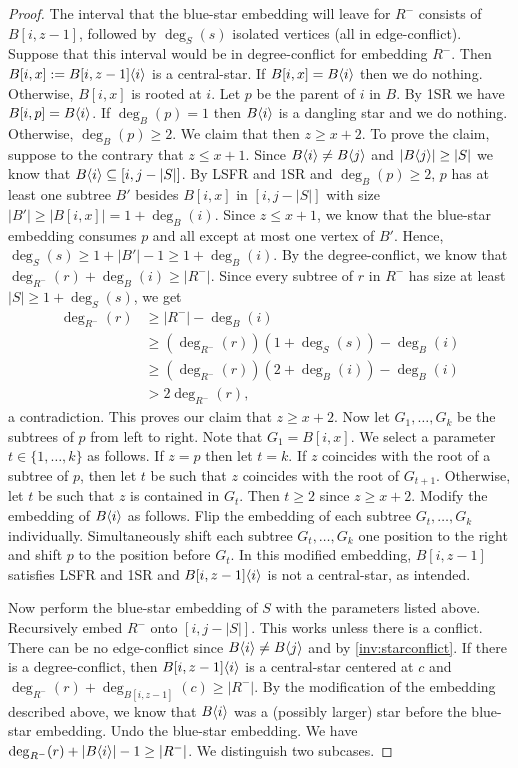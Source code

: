 \documentclass[11pt,a4paper,colorlinks=true,urlcolor=blue,citecolor=red]{article}
\theoremstyle{plain}
\begin{document}
\begin{proof}
  The interval that the blue-star embedding will leave for $R^-$
  consists of $B[i,z-1]$, followed by $\deg_S(s)$ isolated vertices (all
  in edge-conflict). Suppose that this interval would be in
  degree-conflict for embedding $R^-$. Then
  $B[i,x]:=B{[i,z-1]}\langle{i}\rangle$ is a central-star. If
  $B[i,x]=B\langle{i}\rangle$ then we do nothing. Otherwise, $B[i,x]$ is rooted
  at $i$. Let $p$ be the parent of $i$ in $B$. By 1SR we have
  $B[i,p]=B\langle{i}\rangle$. If $\deg_B(p)=1$ then $B\langle{i}\rangle$ is a dangling
  star and we do nothing. Otherwise, $\deg_B(p)\geq2$. We claim that
  then $z\geq x+2$. To prove the claim, suppose to the contrary that
  $z\leq x+1$. Since $B\langle{i}\rangle\neq B\langle{j}\rangle$ and
  $|B\langle{j}\rangle|\geq|S|$ we know that $B\langle{i}\rangle\subseteq[i,j-|S|]$. By LSFR
  and 1SR and $\deg_B(p)\geq2$, $p$ has at least one subtree $B'$
  besides $B[i,x]$ in $[i,j-|S|]$ with size
  $|B'|\geq|B[i,x]|=1+\deg_B(i)$. Since $z\leq x+1$, we know that the
  blue-star embedding consumes $p$ and all except at most one vertex of
  $B'$. Hence, $\deg_S(s)\geq 1+|B'|-1\geq 1+\deg_B(i)$. By the
  degree-conflict, we know that $\deg_{R^-}(r)+\deg_B(i)\geq|R^-|$.
  Since every subtree of $r$ in $R^-$ has size at least $|S|\geq
  1+\deg_S(s)$, we get
\begin{align*}
    \deg_{R^-}(r)&\geq |R^-|-\deg_B(i)\\
    &\geq (\deg_{R^-}(r))(1+\deg_S(s))-\deg_B(i)\\
    &\geq (\deg_{R^-}(r))(2+\deg_B(i))-\deg_B(i)\\
    &>2\deg_{R^-}(r),
  \end{align*}
a contradiction. This proves our claim that $z\geq x+2$. Now let
  $G_1,\dots,G_k$ be the subtrees of $p$ from left to right. Note that
  $G_1=B[i,x]$. We select a parameter $t\in\{1,\ldots,k\}$ as follows.
  If $z=p$ then let $t=k$. If $z$ coincides with the root of a subtree
  of $p$, then let $t$ be such that $z$ coincides with the root of
  $G_{t+1}$. Otherwise, let $t$ be such that $z$ is contained in
  $G_t$. Then $t\geq 2$ since $z\geq x+2$. Modify the embedding of
  $B\langle{i}\rangle$ as follows. Flip the embedding of each subtree
  $G_t,\dots,G_k$ individually. Simultaneously shift each subtree
  $G_t,\dots,G_k$ one position to the right and shift $p$ to the
  position before $G_t$. In this modified embedding, $B[i,z-1]$
  satisfies LSFR and 1SR and $B{[i,z-1]}\langle{i}\rangle$ is not a
  central-star, as intended.

  Now perform the blue-star embedding of $S$ with the parameters listed
  above. Recursively embed $R^-$ onto $[i,j-|S|]$. This works unless
  there is a conflict. There can be no edge-conflict since
  $B\langle{i}\rangle\neq B\langle{j}\rangle$ and by \ref{inv:starconflict}. If there is
  a degree-conflict, then $B{[i,z-1]}\langle{i}\rangle$ is a central-star
  centered at $c$ and $\deg_{R^-}(r)+\deg_{B[i,z-1]}(c)\geq|R^-|$. By
  the modification of the embedding described above, we know that
  $B\langle{i}\rangle$ was a (possibly larger) star before the blue-star
  embedding. Undo the blue-star embedding. We have
  $\deg_{R^-}(r)+|B\langle{i}\rangle|-1\geq|R^-|$. We distinguish two subcases.


\end{proof}
\end{document}
